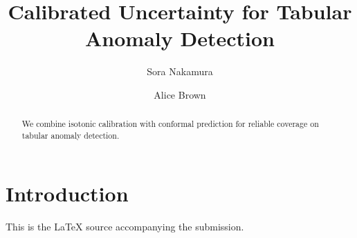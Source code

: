 \documentclass{article}
\title{Calibrated Uncertainty for Tabular Anomaly Detection}
\author{Sora Nakamura \and Alice Brown}
\begin{document}
\maketitle
\begin{abstract}
We combine isotonic calibration with conformal prediction for reliable coverage on tabular anomaly detection.
\end{abstract}
\section{Introduction}
This is the LaTeX source accompanying the submission.
\end{document}

